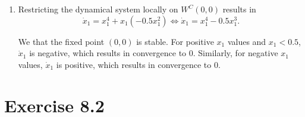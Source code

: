 \documentclass[a4paper,DIV=1]{article}
\theoremstyle{plain}
\begin{document}
\begin{enumerate}[label=(\alph*)]
	 \item Restricting the dynamical system locally on $W^C(0,0)$ results in
	 \[
	 	\dot x_1 = x_1^4+x_1(-0.5x_1^2) \iff \dot x_1 = x_1^4-0.5x_1^3.
	 \]
	 \begin{center}
	 \end{center}
 	We that the fixed point $(0,0)$ is stable. For positive $x_1$ values and $x_1 < 0.5$, $\dot x_1$ is negative, which results in convergence to $0$. Similarly, for negative $x_1$ values, $\dot x_1$ is positive, which results in convergence to $0$.

\end{enumerate}

\section*{Exercise 8.2}
\end{document}
